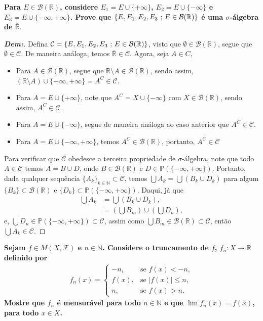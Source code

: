 \newpage
{}
\bigline 
\textbf{Para $E \in \mathcal B(\mathbb R)$, considere $E_1 = E \cup \{+\infty\}$, 
$E_2 = E \cup \{-\infty\}$ e $E_3 = E \cup \{-\infty, +\infty\}$. Prove que 
$\{E, E_1, E_2, E_3\text{ ; }  E\in \mathcal B(\mathbb R)\}$ 
é uma $\sigma$-álgebra de $\overline{\mathbb R}$}. 
\begin{proof}[\textbf{Dem:}] Defina $\mathcal C = \{E, E_1, E_2, E_3\text{ ; }  E
\in \mathcal B(\mathbb R)\}$,
visto que $\emptyset\in \mathcal B(\mathbb R)$, segue que $\emptyset \in \mathcal C$.
De maneira análoga, temos $\overline{\mathbb R} \in \mathcal C$. Agora, seja $A \in C$, 
\begin{itemize}
  \item Para  $A \in \mathcal B(\mathbb R)$, 
    segue que $\mathbb R\setminus A \in \mathcal B(\mathbb R)$, sendo assim,
    $\left(\mathbb R \setminus A \right)\cup \{-\infty, +\infty\} = A^C \in \mathcal C$.

  \item Para $A = E \cup \{+ \infty\}$,
    note que $A^C = X \cup \{- \infty\}$ com 
    $X \in \mathcal B (\mathbb R)$, sendo assim, $A^C \in \mathcal C$. 
  \item Para $A = E \cup \{- \infty\}$,
    segue de maneira análoga ao 
    caso anterior que $A^C \in \mathcal C$. 
  \item Para $A = E \cup \{- \infty, + \infty\}$, temos $A^C \in \mathcal B(\mathbb R)$, 
    portanto, $A^C \in \mathcal C$
\end{itemize}
Para verificar que $\mathcal C$ obedesce a terceira propriedade de $\sigma$-álgebra,
note que todo $A \in \mathcal C$ 
temos $A = B \cup D$, onde $B \in \mathcal B (\mathbb R)$ e 
$D \in \mathbb P (\{-\infty, +\infty\}) $. Portanto, dada qualquer 
sequência $\{A_k\}_{k \in \mathbb N}
\subset \mathcal C$, temos $\bigcup A_k = \bigcup \left(B_k \cup D_k\right)$ para algum 
$\{B_k\} \subset \mathcal B (\mathbb R)$ e 
  $\{D_k\}\subset \mathbb P (\{-\infty, +\infty\})$. Daqui, já que 
\begin{align*}
  \bigcup A_k &= \bigcup \left(B_k \cup D_k\right),\\
  &= \left(\bigcup B_m\right) \cup \left(\bigcup D_n\right), 
\end{align*}
e, $\bigcup D_n \in \mathbb P (\{-\infty, +\infty\}) \subset \mathcal C$, assim como 
  $\bigcup B_m \in \mathcal B(\mathbb R) \subset \mathcal C$, então 
  $\bigcup A_k \in \mathcal C$.
\end{proof}
\biglinend
\newpage
{}
\bigline 
\textbf{Sejam $f \in M(X, \mathcal F)$ e $n \in \mathbb N$. Considere o truncamento de $f$, 
$f_n: X \rightarrow \mathbb R$ definido por
\begin{align*}
  f_n(x) =\begin{cases}
    -n, &\text{se } f(x) < -n,\\
    f(x), &\text{se } |f(x)| \le n,\\
    n, &\text{se } f(x)>n.
  \end{cases}
\end{align*}
Mostre que $f_n$ é mensurável para todo $n \in \mathbb N$ e que $\lim f_n(x) = f(x)$, 
para todo $x \in X$.}
